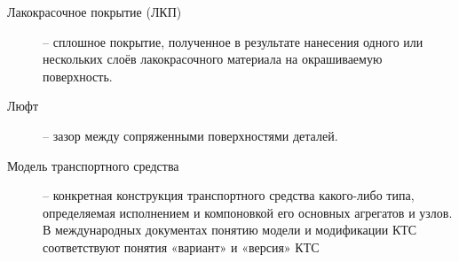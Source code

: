 \begin{description}
	\item
	[Лакокрасочное покрытие (ЛКП)] -- сплошное покрытие, полученное в результате нанесения 	одного или нескольких слоёв лакокрасочного материала на окрашиваемую поверхность.
\item
[Люфт] -- зазор между сопряженными поверхностями деталей.	
\item
[Модель транспортного средства] -- конкретная конструкция транспортного средства какого-либо типа, определяемая исполнением и компоновкой его
основных агрегатов и узлов. В международных документах понятию модели и
модификации КТС соответствуют понятия «вариант» и «версия» КТС



\end{description}
